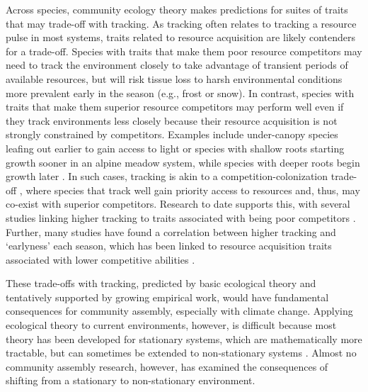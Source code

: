 \documentclass[11pt,letterpaper]{article}
\begin{document}
Across species, community ecology theory makes predictions for suites of traits that may trade-off with tracking. As tracking often relates to tracking a resource pulse in most systems, traits related to resource acquisition are likely contenders for a trade-off. Species with traits that make them poor resource competitors may need to track the environment closely to take advantage of transient periods of available resources, but will risk tissue loss to harsh environmental conditions more prevalent early in the season (e.g., frost or snow). In contrast, species with traits that make them superior resource competitors may perform well even if they track environments less closely because their resource acquisition is not strongly constrained by competitors. Examples include under-canopy species leafing out earlier to gain access to light \citep{heberling2019} or species with shallow roots starting growth sooner in an alpine meadow system, while species with deeper roots begin growth later \citep{Zhu2016BioLetters}. In such cases, tracking is akin to a competition-colonization trade-off \citep{Amarasekare:2003tq}, where species that track well gain priority access to resources and, thus, may co-exist with superior competitors. Research to date supports this, with several studies linking higher tracking to traits associated with being poor competitors \citep{Dorji2013,lasky2016,Zhu2016BioLetters}. Further, many studies have found a correlation between higher tracking and `earlyness' each season, which has been linked to resource acquisition traits associated with lower competitive abilities \citep[][see Box `Trait trade-offs with tracking']{wolkovich2014aob}. 

These trade-offs with tracking, predicted by basic ecological theory and tentatively supported by growing empirical work, would have fundamental consequences for community assembly, especially with climate change. Applying ecological theory to current environments, however, is difficult because most theory has been developed for stationary systems, which are mathematically more tractable, but can sometimes be extended to non-stationary systems \citep{chessonnonstat}. Almost no community assembly research, however, has examined the consequences of shifting from a stationary to non-stationary environment. %
\end{document}
